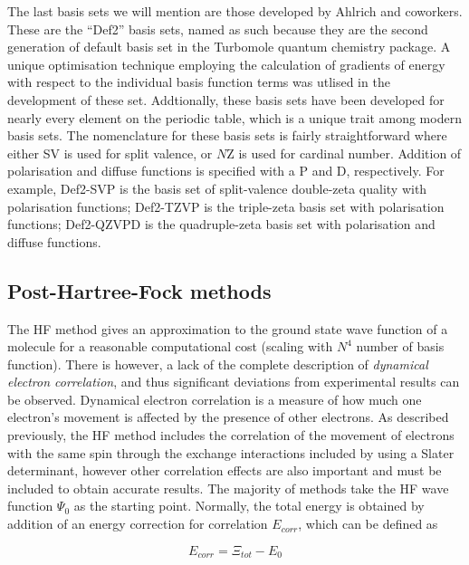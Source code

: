 \vspace{3mm}
\vspace{1mm}

The last basis sets we will mention are those developed by Ahlrich and
coworkers.\cite{Schafer1992} These are the ``Def2'' basis sets, named as such
because they are the second generation of default basis set in the Turbomole
quantum chemistry package.\cite{turbomole} A unique optimisation technique
employing the calculation of gradients of energy with respect to the individual
basis function terms was utlised in the development of these set. Addtionally,
these basis sets have been developed for nearly every element on the periodic
table, which is a unique trait among modern basis sets. The nomenclature for
these basis sets is fairly straightforward where either SV is used for split
valence, or $N$Z is used for cardinal number. Addition of polarisation and
diffuse functions is specified with a P and D, respectively. For example,
Def2-SVP is the basis set of split-valence double-zeta quality with polarisation
functions; Def2-TZVP is the triple-zeta basis set with polarisation functions;
Def2-QZVPD is the quadruple-zeta basis set with polarisation and diffuse
functions.

\subsection{Post-Hartree-Fock methods}

The HF method gives an approximation to the ground state wave function of a
molecule for a reasonable computational cost (scaling with $N^4$ number of basis
function). There is however, a lack of the complete description of
\emph{dynamical electron correlation},\cite{Cramer2004} and thus significant
deviations from experimental results can be observed. Dynamical electron
correlation is a measure of how much one electron's movement is affected by the
presence of other electrons. As described previously, the HF method includes the
correlation of the movement of electrons with the same spin through the exchange
interactions included by using a Slater determinant, however other correlation
effects are also important and must be included to obtain accurate results. The
majority of methods take the HF wave function $\Psi_0$ as the starting point.
Normally, the total energy is obtained by addition of an energy correction for
correlation $E_{corr}$, which can be defined as

\begin{equation}
  E_{corr} = \Xi_{tot} - E_0
\end{equation}

